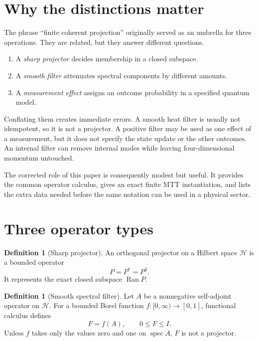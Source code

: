 \documentclass[11pt]{article}
\theoremstyle{definition}
\newtheorem{definition}[theorem]{Definition}
\theoremstyle{remark}
\newcommand{\Hspace}{\mathcal H}
\newcommand{\Ran}{\operatorname{Ran}}
\newcommand{\spec}{\operatorname{spec}}
\newcommand{\Id}{I}
\begin{document}
\tableofcontents

\section{Why the distinctions matter}

The phrase ``finite coherent projection'' originally served as an umbrella
for three operations. They are related, but they answer different questions.

\begin{enumerate}
\item A \emph{sharp projector} decides membership in a closed subspace.
\item A \emph{smooth filter} attenuates spectral components by different
amounts.
\item A \emph{measurement effect} assigns an outcome probability in a
specified quantum model.
\end{enumerate}

Conflating them creates immediate errors. A smooth heat filter is usually not
idempotent, so it is not a projector. A positive filter may be used as one
effect of a measurement, but it does not specify the state update or the
other outcomes. An internal filter can remove internal modes while leaving
four-dimensional momentum untouched.

The corrected role of this paper is consequently modest but useful. It
provides the common operator calculus, gives an exact finite MTT
instantiation, and lists the extra data needed before the same notation can
be used in a physical sector.

\section{Three operator types}

\begin{definition}[Sharp projector]
An orthogonal projector on a Hilbert space \(\Hspace\) is a bounded operator
\[
 P=P^\ast=P^2.
\]
It represents the exact closed subspace \(\Ran P\).
\end{definition}

\begin{definition}[Smooth spectral filter]
Let \(A\) be a nonnegative self-adjoint operator on \(\Hspace\). For a bounded
Borel function \(f:[0,\infty)\to[0,1]\), functional calculus defines
\[
 F=f(A), \qquad 0\leq F\leq \Id.
\]
Unless \(f\) takes only the values zero and one on \(\spec A\), \(F\) is not
a projector.
\end{definition}
\end{document}
